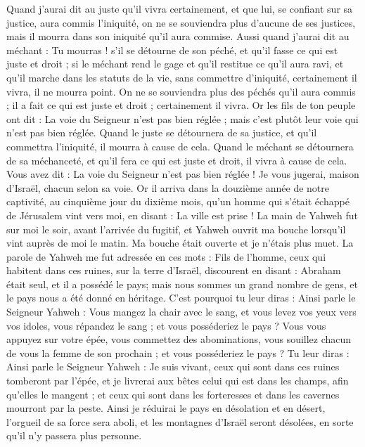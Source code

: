 \begin{multicols}{2}
Quand j'aurai dit au juste qu'il vivra certainement, et que lui, se confiant sur sa justice, aura commis l'iniquité, on ne se souviendra plus d'aucune de ses justices, mais il mourra dans son iniquité qu'il aura commise.
Aussi quand j'aurai dit au méchant : Tu mourras ! s'il se détourne de son péché, et qu'il fasse ce qui est juste et droit ;
si le méchant rend le gage et qu'il restitue ce qu'il aura ravi, et qu'il marche dans les statuts de la vie, sans commettre d'iniquité, certainement il vivra, il ne mourra point.
On ne se souviendra plus des péchés qu'il aura commis ; il a fait ce qui est juste et droit ; certainement il vivra.
Or les fils de ton peuple ont dit : La voie du Seigneur n'est pas bien réglée ; mais c'est plutôt leur voie qui n'est pas bien réglée.
Quand le juste se détournera de sa justice, et qu'il commettra l'iniquité, il mourra à cause de cela.
Quand le méchant se détournera de sa méchanceté, et qu'il fera ce qui est juste et droit, il vivra à cause de cela.
Vous avez dit : La voie du Seigneur n'est pas bien réglée ! Je vous jugerai, maison d'Israël, chacun selon sa voie.
Or il arriva dans la douzième année de notre captivité, au cinquième jour du dixième mois, qu’un homme qui s’était échappé de Jérusalem vint vers moi, en disant : La ville est prise !
La main de Yahweh fut sur moi le soir, avant l’arrivée du fugitif, et Yahweh ouvrit ma bouche lorsqu’il vint auprès de moi le matin. Ma bouche était ouverte et je n’étais plus muet.
La parole de Yahweh me fut adressée en ces mots :
Fils de l’homme, ceux qui habitent dans ces ruines, sur la terre d'Israël, discourent en disant : Abraham était seul, et il a possédé le pays\FTNT{}; mais nous sommes un grand nombre de gens, et le pays nous a été donné en héritage.
C'est pourquoi tu leur diras : Ainsi parle le Seigneur Yahweh : Vous mangez la chair avec le sang, et vous levez vos yeux vers vos idoles, vous répandez le sang ; et vous posséderiez le pays\FTNT{} ?
Vous vous appuyez sur votre épée, vous commettez des abominations, vous souillez chacun de vous la femme de son prochain ; et vous posséderiez le pays ?
Tu leur diras : Ainsi parle le Seigneur Yahweh : Je suis vivant, ceux qui sont dans ces ruines tomberont par l'épée, et je livrerai aux bêtes celui qui est dans les champs, afin qu'elles le mangent ; et ceux qui sont dans les forteresses et dans les cavernes mourront par la peste.
Ainsi je réduirai le pays en désolation et en désert, l'orgueil de sa force sera aboli, et les montagnes d'Israël seront désolées, en sorte qu'il n'y passera plus personne.

\end{multicols}
